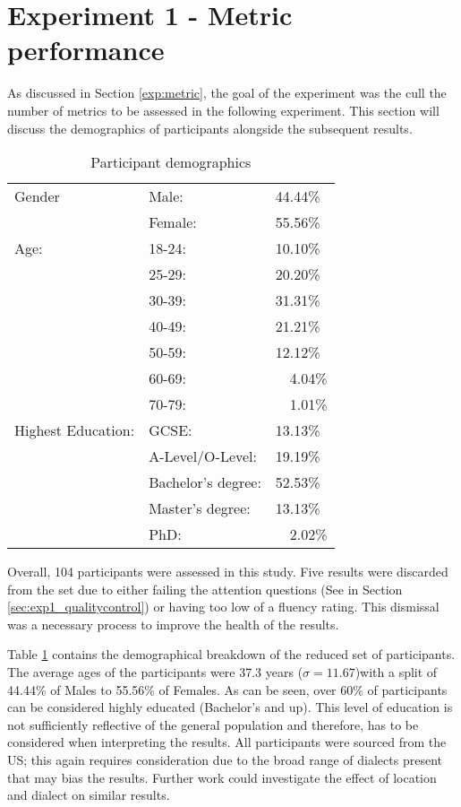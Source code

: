 \section{Experiment 1 - Metric performance}

As discussed in Section \ref{exp:metric}, the goal of the experiment was the cull the number of metrics to be assessed in the following experiment. This section will discuss the demographics of participants alongside the subsequent results.

\begin{table}[h!]
    \centering
    \begin{tabular}{|l|ll|}
        \hline
        Gender & Male: & 44.44\% \\
               & Female: & 55.56\% \\
        \hline
        Age:   & 18-24: & 10.10\% \\
               & 25-29: & 20.20\% \\
               & 30-39: & 31.31\% \\
               & 40-49: & 21.21\% \\
               & 50-59: & 12.12\% \\
               & 60-69: & ~~4.04\% \\ 
               & 70-79: & ~~1.01\% \\ 
               
        \hline
        Highest Education:  
        & GCSE:                 & 13.13\% \\
        & A-Level/O-Level:      & 19.19\% \\
        & Bachelor's degree:    & 52.53\% \\
        & Master's degree:      & 13.13\% \\ 
        & PhD:                  & ~~2.02\%  \\
        \hline

    \end{tabular}
    \caption{Participant demographics}
    \label{tab:exp1_demo}
\end{table}

Overall, 104 participants were assessed in this study. Five results were discarded from the set due to either failing the attention questions (See in Section \ref{sec:exp1_qualitycontrol}) or having too low of a fluency rating. This dismissal was a necessary process to improve the health of the results. 

Table \ref{tab:exp1_demo} contains the demographical breakdown of the reduced set of participants. The average ages of the participants were 37.3 years ($\sigma = 11.67$)with a split of 44.44\% of Males to 55.56\% of Females. As can be seen, over 60\% of participants can be considered highly educated (Bachelor’s and up). This level of education is not sufficiently reflective of the general population and therefore, has to be considered when interpreting the results. All participants were sourced from the US; this again requires consideration due to the broad range of dialects present that may bias the results. Further work could investigate the effect of location and dialect on similar results. 

